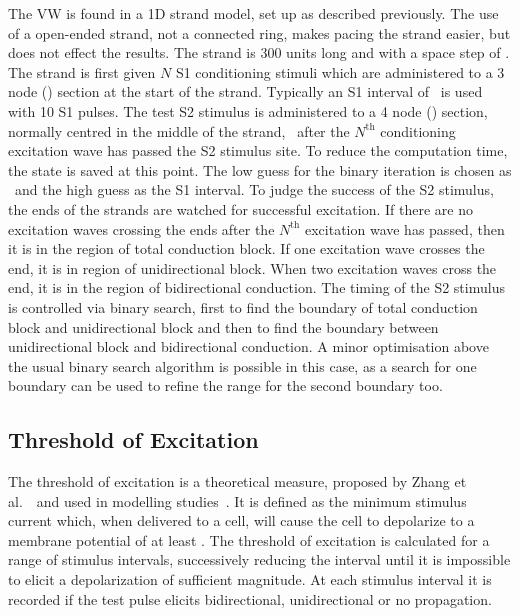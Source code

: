 The VW is found in a 1D strand model, set up as described previously.
The use of a open-ended strand, not a connected ring, makes pacing the strand
easier, but does not effect the results.
The strand is 300 units long and with a space step of .
The strand is first given $N$ S1 conditioning stimuli which are administered to a
3 node () section at the start of the strand.
Typically an S1 interval of \ is used with 10 S1 pulses.
The test S2 stimulus is administered to a 4 node () section, normally
centred in the middle of the strand, \ after the $N^{\text{th}}$
conditioning excitation wave has passed the S2 stimulus site.
To reduce the computation time, the state is saved at this point.
The low guess for the binary iteration is chosen as \ and the high guess
as the S1 interval.
To judge the success of the S2 stimulus, the ends of the strands are watched for
successful excitation.
If there are no excitation waves crossing the ends after the $N^{\text{th}}$
excitation wave has passed, then it is in the region of total conduction block.
If one excitation wave crosses the end, it is in region of unidirectional block.
When two excitation waves cross the end, it is in the region of bidirectional
conduction.
The timing of the S2 stimulus is controlled via binary search, first to find the
boundary of total conduction block and unidirectional block and then to find the
boundary between unidirectional block and bidirectional conduction.
A minor optimisation above the usual binary search algorithm is possible in this
case, as a search for one boundary can be used to refine the range for the
second boundary too.

\subsection{Threshold of Excitation}

The threshold of excitation is a theoretical measure, proposed by Zhang et
al.~\cite{Zhang2003}\ and used in modelling studies~\cite{Kharche2008}.  It is
defined as the minimum stimulus current which, when delivered to a cell, will
cause the cell to depolarize to a membrane potential of at least .  The
threshold of excitation is calculated for a range of stimulus intervals,
successively reducing the interval until it is impossible to elicit a
depolarization of sufficient magnitude.  At each stimulus interval it is
recorded if the test pulse elicits bidirectional, unidirectional or no
propagation.

